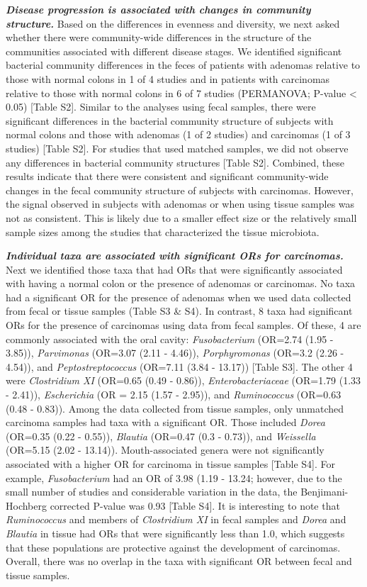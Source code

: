 \documentclass[12pt,]{article}
\begin{document}
\textbf{\emph{Disease progression is associated with changes in
community structure.}} Based on the differences in evenness and
diversity, we next asked whether there were community-wide differences
in the structure of the communities associated with different disease
stages. We identified significant bacterial community differences in the
feces of patients with adenomas relative to those with normal colons in
1 of 4 studies and in patients with carcinomas relative to those with
normal colons in 6 of 7 studies (PERMANOVA; P-value \textless{} 0.05)
{[}Table S2{]}. Similar to the analyses using fecal samples, there were
significant differences in the bacterial community structure of subjects
with normal colons and those with adenomas (1 of 2 studies) and
carcinomas (1 of 3 studies) {[}Table S2{]}. For studies that used
matched samples, we did not observe any differences in bacterial
community structures {[}Table S2{]}. Combined, these results indicate
that there were consistent and significant community-wide changes in the
fecal community structure of subjects with carcinomas. However, the
signal observed in subjects with adenomas or when using tissue samples
was not as consistent. This is likely due to a smaller effect size or
the relatively small sample sizes among the studies that characterized
the tissue microbiota.

\textbf{\emph{Individual taxa are associated with significant ORs for
carcinomas.}} Next we identified those taxa that had ORs that were
significantly associated with having a normal colon or the presence of
adenomas or carcinomas. No taxa had a significant OR for the presence of
adenomas when we used data collected from fecal or tissue samples (Table
S3 \& S4). In contrast, 8 taxa had significant ORs for the presence of
carcinomas using data from fecal samples. Of these, 4 are commonly
associated with the oral cavity: \emph{Fusobacterium} (OR=2.74 (1.95 -
3.85)), \emph{Parvimonas} (OR=3.07 (2.11 - 4.46)), \emph{Porphyromonas}
(OR=3.2 (2.26 - 4.54)), and \emph{Peptostreptococcus} (OR=7.11 (3.84 -
13.17)) {[}Table S3{]}. The other 4 were \emph{Clostridium XI} (OR=0.65
(0.49 - 0.86)), \emph{Enterobacteriaceae} (OR=1.79 (1.33 - 2.41)),
\emph{Escherichia} (OR = 2.15 (1.57 - 2.95)), and \emph{Ruminococcus}
(OR=0.63 (0.48 - 0.83)). Among the data collected from tissue samples,
only unmatched carcinoma samples had taxa with a significant OR. Those
included \emph{Dorea} (OR=0.35 (0.22 - 0.55)), \emph{Blautia} (OR=0.47
(0.3 - 0.73)), and \emph{Weissella} (OR=5.15 (2.02 - 13.14)).
Mouth-associated genera were not significantly associated with a higher
OR for carcinoma in tissue samples {[}Table S4{]}. For example,
\emph{Fusobacterium} had an OR of 3.98 (1.19 - 13.24; however, due to
the small number of studies and considerable variation in the data, the
Benjimani-Hochberg corrected P-value was 0.93 {[}Table S4{]}. It is
interesting to note that \emph{Ruminococcus} and members of
\emph{Clostridium XI} in fecal samples and \emph{Dorea} and
\emph{Blautia} in tissue had ORs that were significantly less than 1.0,
which suggests that these populations are protective against the
development of carcinomas. Overall, there was no overlap in the taxa
with significant OR between fecal and tissue samples.
\end{document}
